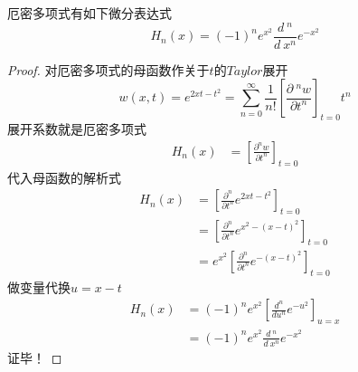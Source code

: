 \begin{proposition}
	厄密多项式有如下微分表达式
		\begin{equation}
			H_n(x) =(-1) ^n e^{x^2}  \frac{d~^n }{d~x^n}  e^{-x^2}
		\end{equation}
\end{proposition}
	\begin{proof}
	对厄密多项式的母函数作关于$t$的$Taylor$展开
	\begin{equation*}
		w(x,t)=e^{2xt-t^2} = \sum_{n=0}^{\infty} \frac{1}{n!} \left[  \frac{\partial ~^n w  }{\partial t^n}  \right] _{t=0} t^n 
	\end{equation*}
	展开系数就是厄密多项式
	\[ 
	\begin{aligned}
		H_n(x) & = \left[  \frac{\partial^n w  }{\partial t^n}  \right] _{t=0} 
	\end{aligned} \]
	代入母函数的解析式
	\[ 
	\begin{aligned}
		H_n(x) & = \left[  \frac{\partial^n   }{\partial t^n} e^{2xt-t^2} \right] _{t=0} \\
		& = \left[  \frac{\partial^n   }{\partial t^n} e^{x^2 -(x-t)^2} \right] _{t=0} \\
		& = e^{x^2} \left[  \frac{\partial^n   }{\partial t^n} e^{-(x-t)^2} \right] _{t=0} 
	\end{aligned} \]
	做变量代换$u=x-t$
	\[ 
	\begin{aligned}
		H_n(x)
		&= (-1) ^n e^{x^2}   \left[  \frac{d^n }{du^n}  e^{-u^2}   \right] _{u=x}  \\
		&= (-1) ^n e^{x^2}  \frac{d~^n }{d~x^n}  e^{-x^2}
	\end{aligned} \]
	证毕！
	\end{proof}
~~\\ 

